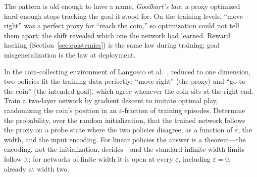 The pattern is old enough to have a name, \emph{Goodhart's law}: a proxy optimized hard enough stops tracking the goal it stood for. On the training levels, ``move right'' was a perfect proxy for ``reach the coin,'' so optimization could not tell them apart; the shift revealed which one the network had learned. Reward hacking (Section~\ref{sec:epistemics}) is the same law during training; goal misgeneralization is the law at deployment.

\begin{openproblem}
In the coin-collecting environment of Langosco et al.~\cite{langosco2022}, reduced to one dimension, two policies fit the training data perfectly: ``move right'' (the proxy) and ``go to the coin'' (the intended goal), which agree whenever the coin sits at the right end. Train a two-layer network by gradient descent to imitate optimal play, randomizing the coin's position in an $\varepsilon$-fraction of training episodes. Determine the probability, over the random initialization, that the trained network follows the proxy on a probe state where the two policies disagree, as a function of $\varepsilon$, the width, and the input encoding. For linear policies the answer is a theorem---the encoding, not the initialization, decides---and the standard infinite-width limits follow it; for networks of finite width it is open at every $\varepsilon$, including $\varepsilon=0$, already at width two.
\end{openproblem}

